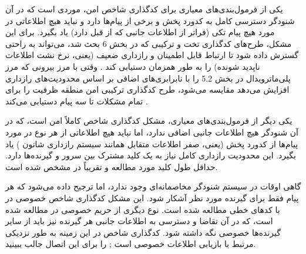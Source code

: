 یکی از فرمول‌بندی‌های معیاری برای کدگذاری شاخص امن، موردی است که در آن شنودگر دسترسی کامل به کدورد پخش و برخی از پیام‌ها دارد و نباید هیچ اطلاعاتی در مورد هیچ پیام تکی (فراتر از اطلاعات جانبی که از قبل دارد) یاد بگیرد. برای این مشکل، طرح‌های کدگذاری تخت و ترکیبی که در بخش 6 بحث شد، می‌تواند به راحتی گسترش داده شود تا ارتباط قابل اطمینان و رازداری ضعیف (یعنی، نرخ نشت اطلاعات ناپدید شونده) را به طور همزمان دستیابی کند \lr{[98]}. وقتی با مرز بیرونی که مرز پلی‌ماترویدال در بخش 5.2 را با نابرابری‌های اضافی بر اساس محدودیت‌های رازداری افزایش می‌دهد مقایسه می‌شود، طرح کدگذاری ترکیبی امن منطقه ظرفیت را برای تمام مشکلات تا سه پیام دستیابی می‌کند \lr{[98]}.

یکی دیگر از فرمول‌بندی‌های معیاری، مشکل کدگذاری شاخص کاملاً امن است، که در آن شنودگر هیچ اطلاعات جانبی اضافی ندارد، اما نباید هیچ اطلاعاتی از هر نوع در مورد پیام‌ها از کدورد پخش (یعنی، صفر اطلاعات متقابل همانند سیستم رازداری شانون \lr{[132]}) یاد بگیرد. این محدودیت رازداری کامل نیاز به یک کلید مشترک بین سرور و گیرنده‌ها دارد. حداقل طول کلید مورد مطالعه و تقریباً در \lr{[110]} مشخص شده است.

گاهی اوقات در سیستم شنودگر مخاصمانه‌ای وجود ندارد، اما ترجیح داده می‌شود که هر پیام فقط برای گیرنده مورد نظر آشکار شود. این مشکل کدگذاری شاخص خصوصی در \lr{[111]} با کدهای خطی مطالعه شده است. نوع دیگری از حریم خصوصی در \lr{[84]} مطالعه شده است، که در آن تقاضا و دسترسی به اطلاعات جانبی هر گیرنده نیز باید از سایر گیرنده‌ها خصوصی نگه داشته شود. کدگذاری شاخص در این زمینه به طور نزدیکی مرتبط با بازیابی اطلاعات خصوصی است \lr{[44, 19]}; \lr{[142]} را برای این اتصال جالب ببینید.



